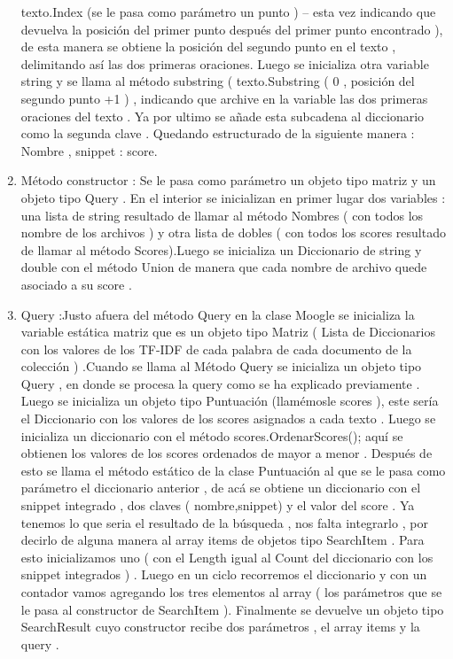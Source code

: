 \documentclass[10pt]{extarticle}
\begin{document}
\begin{enumerate}
	texto.Index (se le pasa como parámetro un punto ) – esta vez indicando que devuelva la posición 
	del primer punto después del primer punto encontrado ), de esta manera se obtiene la posición 
	del segundo punto en el texto , delimitando así las dos primeras oraciones. Luego se inicializa otra 
	variable string y se llama al método substring ( texto.Substring ( 0 , posición del segundo punto +1 
	) , indicando que archive en la variable las dos primeras oraciones del texto . Ya por ultimo se 
	añade esta subcadena al diccionario como la segunda clave . Quedando estructurado de la 
	siguiente manera : Nombre , snippet : score. 
	\item  Método constructor : Se le pasa como parámetro un objeto tipo matriz y un objeto 
	tipo Query . En el interior se inicializan en primer lugar dos variables : una lista de string resultado 
	de llamar al método Nombres ( con todos los nombre de los archivos ) y otra lista de dobles ( con 
	todos los scores resultado de llamar al método Scores).Luego se inicializa un Diccionario de string y 
	double con el método Union de manera que cada nombre de archivo quede asociado a su score . 
	
    \item  Query :Justo afuera del método Query en la clase Moogle se inicializa la variable estática matriz que es un 
	objeto tipo Matriz ( Lista de Diccionarios con los valores de los TF-IDF de cada palabra de cada 
	documento de la colección ) .Cuando se llama al Método Query se inicializa un objeto tipo Query , en donde se procesa la query 
	como se ha explicado previamente . Luego se inicializa un objeto tipo Puntuación (llamémosle 
	scores ), este sería el Diccionario con los valores de los scores asignados a cada texto . Luego se 
	inicializa un diccionario con el método scores.OrdenarScores(); aquí se obtienen los valores de los 
	scores ordenados de mayor a menor . Después de esto se llama el método estático de la clase 
	Puntuación al que se le pasa como parámetro el diccionario anterior , de acá se obtiene un 
	diccionario con el snippet integrado , dos claves ( nombre,snippet) y el valor del score . 
	Ya tenemos lo que seria el resultado de la búsqueda , nos falta integrarlo , por decirlo de alguna 
	manera al array items de objetos tipo SearchItem . Para esto inicializamos uno ( con el Length igual 
	al Count del diccionario con los snippet integrados ) . Luego en un ciclo recorremos el diccionario y 
	con un contador vamos agregando los tres elementos al array ( los parámetros que se le pasa al 
	constructor de SearchItem ). 
	Finalmente se devuelve un objeto tipo SearchResult cuyo constructor recibe dos parámetros , el 
	array items y la query .
	
\end{enumerate}
\end{document}
